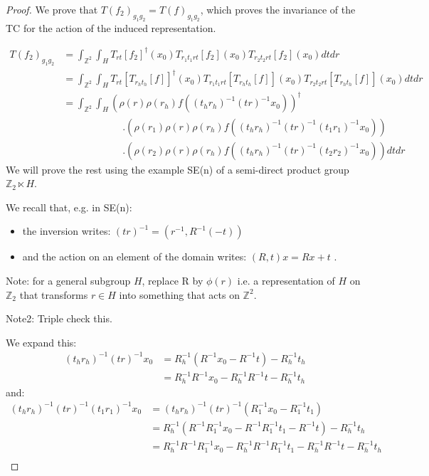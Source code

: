 \documentclass{article}
\begin{document}
\begin{proof}

We prove that $T(f_2)_{g_1g_2} = T(f)_{g_1g_2} $, which proves the invariance of the TC for the action of the induced representation.

\begin{align*}
    T(f_2)_{g_1g_2}
        &= \int_{\mathbb{Z}^2} \int_H
            T_{rt}[f_2]^\dagger (x_0)
                T_{r_1t_1rt}[f_2](x_0)
                    T_{r_2t_2rt}[f_2](x_0)
                    dtdr \\
        &= \int_{\mathbb{Z}^2} \int_H
            T_{rt}[T_{r_ht_h}[f]]^\dagger (x_0)
                T_{r_1t_1rt}[T_{r_ht_h}[f]](x_0)
                    T_{r_2t_2rt}[T_{r_ht_h}[f]](x_0)
                    dtdr \\
        &= \int_{\mathbb{Z}^2} \int_H
            \left(\rho(r)\rho(r_h)
            f((t_hr_h)^{-1}(tr)^{-1}x_0)\right)^\dagger \\
                &\qquad\qquad\qquad.\left(
                \rho(r_1)\rho(r)\rho(r_h)
                f((t_hr_h)^{-1}(tr)^{-1}(t_1r_1)^{-1}x_0)\right)\\
                &\qquad\qquad\qquad.\left(
                \rho(r_2)\rho(r)\rho(r_h)
                f((t_hr_h)^{-1}(tr)^{-1}(t_2r_2)^{-1}x_0)\right) dtdr
\end{align*}
We will prove the rest using the example SE(n) of a semi-direct product group $\mathbb{Z}_2 \ltimes H$.

We recall that, e.g. in SE(n):
\begin{itemize}
    \item the inversion writes: $(tr)^{-1} = (r^{-1}, R^{-1}(-t))$
    \item and the action on an element of the domain writes: $(R, t)x = Rx+t$ .
\end{itemize}
Note: for a general subgroup $H$, replace R by $\phi(r)$ i.e. a representation of $H$ on $\mathbb{Z}_2$ that transforms $r \in H$ into something that acts on $\mathbb{Z}^2$.

Note2: Triple check this.

We expand this:
\begin{align*}
    (t_hr_h)^{-1}(tr)^{-1} x_0
        &= R_h^{-1}(R^{-1}x_0 - R^{-1}t) - R_h^{-1}t_h \\
        &= R_h^{-1}R^{-1}x_0 - R_h^{-1}R^{-1}t- R_h^{-1}t_h
\end{align*}
and:
\begin{align*}
     (t_hr_h)^{-1}(tr)^{-1}(t_1r_1)^{-1} x_0
     &= (t_hr_h)^{-1}(tr)^{-1} (R_1^{-1}x_0 - R_1^{-1}t_1) \\
     &= R_h^{-1}(R^{-1}R_1^{-1}x_0 - R^{-1}R_1^{-1}t_1 - R^{-1}t) - R_h^{-1}t_h \\
     &= R_h^{-1}R^{-1}R_1^{-1}x_0 - R_h^{-1}R^{-1}R_1^{-1}t_1 - R_h^{-1}R^{-1}t - R_h^{-1}t_h \\
\end{align*}


\end{proof}
\end{document}
